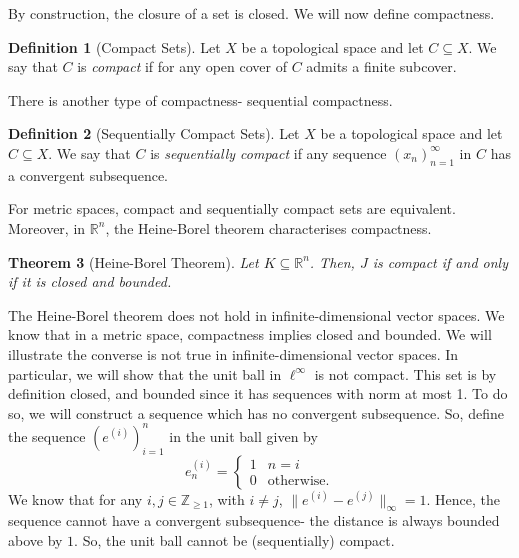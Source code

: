 \documentclass[a4paper, openany]{memoir}
\theoremstyle{definition}
\newtheorem{definition}{Definition}[section]
\theoremstyle{plain}
\newtheorem{theorem}[definition]{Theorem}
\begin{document}
    \noindent By construction, the closure of a set is closed. We will now define compactness.
    \begin{definition}[Compact Sets]
        Let $X$ be a topological space and let $C \subseteq X$. We say that $C$ is \emph{compact} if for any open cover of $C$ admits a finite subcover.
    \end{definition}
    \noindent There is another type of compactness- sequential compactness.
    \begin{definition}[Sequentially Compact Sets]
        Let $X$ be a topological space and let $C \subseteq X$. We say that $C$ is \emph{sequentially compact} if any sequence $(x_n)_{n=1}^\infty$ in $C$ has a convergent subsequence.
    \end{definition}
    \noindent For metric spaces, compact and sequentially compact sets are equivalent. Moreover, in $\mathbb{R}^n$, the Heine-Borel theorem characterises compactness.
    \begin{theorem}[Heine-Borel Theorem]
        Let $K \subseteq \mathbb{R}^n$. Then, $J$ is compact if and only if it is closed and bounded.
    \end{theorem}
    
    The Heine-Borel theorem does not hold in infinite-dimensional vector spaces. We know that in a metric space, compactness implies closed and bounded. We will illustrate the converse is not true in infinite-dimensional vector spaces. In particular, we will show that the unit ball in $\ell^\infty$ is not compact. This set is by definition closed, and bounded since it has sequences with norm at most 1. To do so, we will construct a sequence which has no convergent subsequence. So, define the sequence $(e^{(i)})_{i=1}^n$ in the unit ball given by
    \[e^{(i)}_n = \begin{cases}
        1 & n = i \\
        0 & \textrm{otherwise}.
    \end{cases}\]
    We know that for any $i, j \in \mathbb{Z}_{\geq 1}$, with $i \neq j$, $\lVert e^{(i)} - e^{(j)} \rVert_\infty = 1$. Hence, the sequence cannot have a convergent subsequence- the distance is always bounded above by $1$. So, the unit ball cannot be (sequentially) compact.
\end{document}
